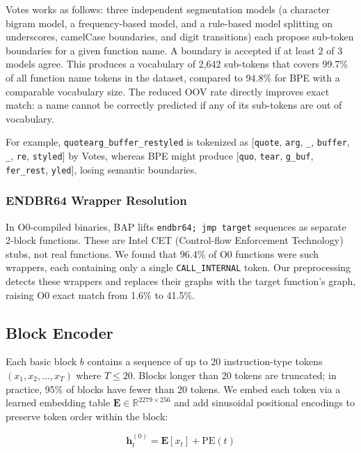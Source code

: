 \documentclass[sigconf,nonacm]{acmart}
\begin{document}
Votes works as follows: three independent segmentation models (a character bigram model, a frequency-based model, and a rule-based model splitting on underscores, camelCase boundaries, and digit transitions) each propose sub-token boundaries for a given function name. A boundary is accepted if at least 2 of 3 models agree. This produces a vocabulary of 2,642 sub-tokens that covers 99.7\% of all function name tokens in the dataset, compared to 94.8\% for BPE with a comparable vocabulary size. The reduced OOV rate directly improves exact match: a name cannot be correctly predicted if any of its sub-tokens are out of vocabulary.

For example, \texttt{quotearg\_buffer\_restyled} is tokenized as [\texttt{quote}, \texttt{arg}, \texttt{\_}, \texttt{buffer}, \texttt{\_}, \texttt{re}, \texttt{styled}] by Votes, whereas BPE might produce [\texttt{quo}, \texttt{tear}, \texttt{g\_buf}, \texttt{fer\_rest}, \texttt{yled}], losing semantic boundaries.

\subsubsection{ENDBR64 Wrapper Resolution}

In O0-compiled binaries, BAP lifts \texttt{endbr64; jmp target} sequences as separate 2-block functions. These are Intel CET (Control-flow Enforcement Technology) stubs, not real functions. We found that 96.4\% of O0 functions were such wrappers, each containing only a single \texttt{CALL\_INTERNAL} token. Our preprocessing detects these wrappers and replaces their graphs with the target function's graph, raising O0 exact match from 1.6\% to 41.5\%.

\subsection{Block Encoder}
\label{sec:block_encoder}

Each basic block $b$ contains a sequence of up to 20 instruction-type tokens $(x_1, x_2, \ldots, x_T)$ where $T \leq 20$. Blocks longer than 20 tokens are truncated; in practice, 95\% of blocks have fewer than 20 tokens. We embed each token via a learned embedding table $\mathbf{E} \in \mathbb{R}^{2279 \times 256}$ and add sinusoidal positional encodings to preserve token order within the block:

\begin{equation}
    \mathbf{h}_t^{(0)} = \mathbf{E}[x_t] + \text{PE}(t)
\end{equation}
\end{document}
